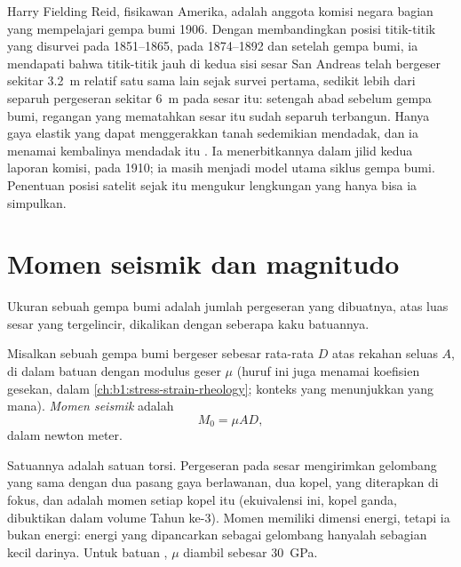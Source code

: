 \begin{history}
Harry Fielding Reid, fisikawan Amerika, adalah anggota komisi negara bagian yang mempelajari gempa bumi 1906. Dengan membandingkan posisi titik-titik yang disurvei pada 1851--1865, pada 1874--1892 dan setelah gempa bumi, ia mendapati bahwa titik-titik jauh di kedua sisi sesar San Andreas telah bergeser sekitar \qty{3.2}{m} relatif satu sama lain sejak survei pertama, sedikit lebih dari separuh pergeseran sekitar \qty{6}{m} pada sesar itu: setengah abad sebelum gempa bumi, regangan yang mematahkan sesar itu sudah separuh terbangun. Hanya gaya elastik yang dapat menggerakkan tanah sedemikian mendadak, dan ia menamai kembalinya mendadak itu . Ia menerbitkannya dalam jilid kedua
laporan komisi, pada 1910; ia masih menjadi model utama siklus gempa bumi. Penentuan posisi satelit sejak itu mengukur lengkungan yang hanya bisa ia simpulkan.
\end{history}

\section{Momen seismik dan magnitudo}\label{sec:b1:earthquake-source:moment}

Ukuran sebuah gempa bumi adalah jumlah pergeseran yang dibuatnya, atas luas sesar yang tergelincir, dikalikan dengan seberapa kaku batuannya.

\begin{definition}\label{def:b1:earthquake-source:moment}
Misalkan sebuah gempa bumi bergeser sebesar rata-rata $D$ atas rekahan seluas $A$, di dalam batuan dengan modulus geser $\mu$ (huruf ini juga menamai koefisien gesekan, dalam \cref{ch:b1:stress-strain-rheology}; konteks yang menunjukkan yang mana). \emph{Momen seismik} adalah
\[
  M_0 = \mu A D ,
\]
dalam newton meter.
\end{definition}

Satuannya adalah satuan torsi. Pergeseran pada sesar mengirimkan gelombang yang sama dengan dua pasang gaya berlawanan, dua kopel, yang diterapkan di fokus, dan  adalah momen setiap kopel itu (ekuivalensi ini, kopel ganda, dibuktikan dalam volume Tahun ke-3). Momen memiliki dimensi energi, tetapi ia bukan energi: energi yang dipancarkan sebagai gelombang hanyalah sebagian kecil darinya. Untuk batuan , $\mu$ diambil sebesar \qty{30}{GPa}.

